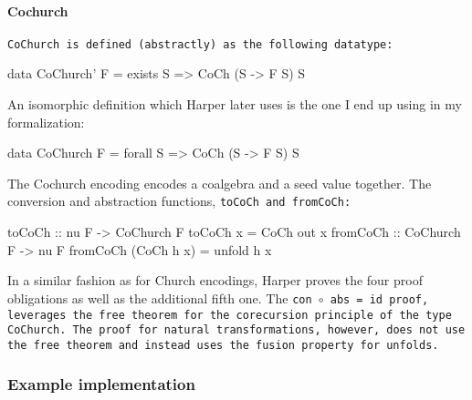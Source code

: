 \paragraph{Cochurch} \tt{CoChurch} is defined (abstractly) as the following datatype:
\begin{code}
data CoChurch' F = exists S => CoCh (S -> F S) S
\end{code}
An isomorphic definition which Harper later uses is the one I end up using in my formalization:
\begin{code}
data CoChurch F = forall S => CoCh (S -> F S) S
\end{code}
The Cochurch encoding encodes a coalgebra and a seed value together.
The conversion and abstraction functions, \tt{toCoCh} and \tt{fromCoCh}:
\begin{code}
toCoCh :: nu F -> CoChurch F
toCoCh x = CoCh out x
fromCoCh :: CoChurch F -> nu F
fromCoCh (CoCh h x) = unfold h x  
\end{code}
In a similar fashion as for Church encodings, Harper proves the four proof obligations as well as the additional fifth one.
The \tt{con $\circ$ abs = id} proof, leverages the free theorem for the corecursion principle of the type \tt{CoChurch}.
The proof for natural transformations, however, does not use the free theorem and instead uses the fusion property for unfolds.

\subsubsection{Example implementation}

\iffalse
\begin{itemize}
    \Item 
\end{itemize}
\fi
